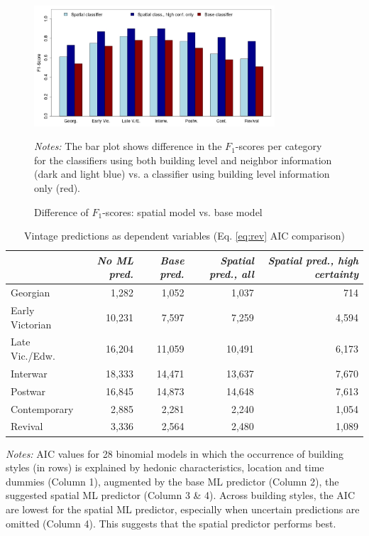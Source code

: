 \documentclass[]{article}
\begin{document}
\begin{figure}[htb!]
  \caption{Difference of $F_1$-scores: spatial model vs. base model }
  \centering
    \includegraphics[width=0.8\textwidth]{figures/barplot_f1scores.jpg}
  \label{fig:boxplot}
\begin{minipage}{0.7\textwidth}
\vspace{0.25cm}
\footnotesize \emph{Notes:} The bar plot shows difference in the $F_1$-scores per category for the classifiers using both building level and neighbor information (dark and light blue) vs. a classifier using building level information only (red).
\end{minipage}
\end{figure}

\begin{table}[htb!]
\caption{Vintage predictions as dependent variables (Eq. \ref{eq:rev} AIC comparison) }
\label{tab:aic}
\centering
\begin{tabular}{lrrrr}
  \toprule
 & \emph{No ML pred.} & \emph{Base pred.} & \emph{Spatial pred., all} & \emph{Spatial pred., high certainty} \\ 
  \midrule
  Georgian & 1,282 & 1,052 & 1,037 & 714 \\ 
  Early Victorian & 10,231 & 7,597 & 7,259 & 4,594 \\ 
  Late Vic./Edw. & 16,204 & 11,059 & 10,491 & 6,173 \\ 
  Interwar & 18,333 & 14,471 & 13,637 & 7,670 \\ 
  Postwar & 16,845 & 14,873 & 14,648 & 7,613 \\ 
  Contemporary & 2,885 & 2,281 & 2,240 & 1,054 \\ 
  Revival & 3,336 & 2,564 & 2,480 & 1,089 \\ 
   \bottomrule
\end{tabular}
\begin{minipage}{0.7\textwidth}
\vspace{0.25cm}
\footnotesize \emph{Notes:}
AIC values for 28 binomial models in which the occurrence of building styles (in rows) is explained by hedonic characteristics, location and time dummies (Column 1), augmented by the base ML predictor (Column 2), the suggested spatial ML predictor (Column 3 \& 4). Across building styles, the AIC are lowest for the spatial ML predictor, especially when uncertain predictions are omitted (Column 4). This suggests that the spatial predictor performs best.
\end{minipage}
\end{table}
\end{document}
